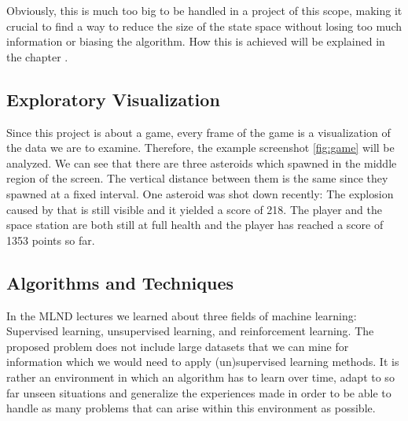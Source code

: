 \documentclass[a4paper,10pt]{article}
\begin{document}
Obviously, this is much too big to be handled in a project of this scope, making it crucial to find a way to reduce the size of the state space without losing too much information or biasing the algorithm.
How this is achieved will be explained in the chapter .


\subsection{Exploratory Visualization}

Since this project is about a game, every frame of the game is a visualization of the data we are to examine.
Therefore, the example screenshot \ref{fig:game} will be analyzed.
We can see that there are three asteroids which spawned in the middle region of the screen.
The vertical distance between them is the same since they spawned at a fixed interval.
One asteroid was shot down recently: The explosion caused by that is still visible and it yielded a score of 218.
The player and the space station are both still at full health and the player has reached a score of 1353 points so far.
\subsection{Algorithms and Techniques}
\label{algorithms}

In the MLND lectures we learned about three fields of machine learning: Supervised learning, unsupervised learning, and reinforcement learning.
The proposed problem does not include large datasets that we can mine for information which we would need to apply (un)supervised learning methods. 
It is rather an environment in which an algorithm has to learn over time, adapt to so far unseen  situations and generalize the experiences made in order to be able to handle as many problems that can arise within this environment as possible.
\end{document}
